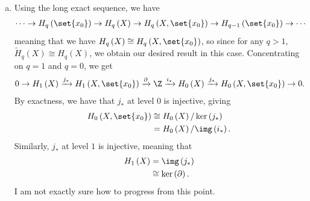 \documentclass[10pt]{mypackage}
\begin{document}
\begin{solution}
\begin{enumerate}[(a)]
      As for the case of $q = 0$, we use the fact that the augmentation homomorphism $\ve$ respects both $C_0\left( X \right)$ and $C_0\left( A \right)$, meaning that in degree $0$, our short exact sequence of chain complexes reads as
      \begin{align*}
        0 \rightarrow \widetilde{C}_0\left( A \right)\rightarrow \widetilde{C}_0\left( X \right)\rightarrow C_0\left( X,A \right)\rightarrow 0.
      \end{align*}
      I am not exactly sure how to progress from this point.
    \item Using the long exact sequence, we have
      \begin{align*}
        \cdots\rightarrow H_q\left( \set{x_0} \right) \rightarrow H_q\left( X \right) \rightarrow H_q\left( X,\set{x_0} \right)\rightarrow H_{q-1}\left( \set{x_0} \right)\rightarrow\cdots
      \end{align*}
      meaning that we have $H_q\left( X \right)\cong H_q\left( X,\set{x_0} \right)$, so since for any $q > 1$, $ \widetilde{H}_q\left( X \right)\cong H_q(X) $, we obtain our desired result in this case. Concentrating on $q = 1$ and $q = 0$, we get
      \begin{align*}
        0 \rightarrow H_1\left( X \right)\xrightarrow{j_{\ast}} H_1\left( X,\set{x_0} \right)\xrightarrow{\partial} \Z\xrightarrow{i_{\ast}} H_0\left( X \right)\xrightarrow{j_{\ast}} H_0\left( X,\set{x_0} \right)\rightarrow 0.
      \end{align*}
      By exactness, we have that $j_{\ast}$ at level $0$ is injective, giving
      \begin{align*}
        H_{0}\left( X,\set{x_0} \right) &\cong H_0\left( X \right)/\ker\left( j_{\ast} \right)\\
                                        &= H_0\left( X \right)/\img\left( i_{\ast} \right).
      \end{align*}
      Similarly, $j_{\ast}$ at level $1$ is injective, meaning that
      \begin{align*}
        H_1\left( X \right) &= \img\left( j_{\ast} \right)\\
                            &\cong \ker\left( \partial \right).
      \end{align*}
      I am not exactly sure how to progress from this point.
  \end{enumerate}
\end{solution}
\end{document}
